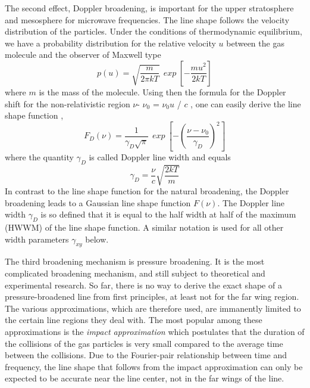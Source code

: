 The second effect, Doppler broadening, is important for the upper
stratosphere and mesosphere for microwave frequencies. The line shape
follows the velocity distribution of the particles. Under the conditions
of thermodynamic equilibrium, we have  a probability distribution for
the relative velocity $u$ between the gas molecule and the observer 
of Maxwell type 
\begin{equation}\label{eq:abs_theory:maxwell_distribution1}
  p(u)=\sqrt{\frac{m}{2\pi kT}}~~exp~\left[-\frac{mu^2}{2kT}\right]
\end{equation}
where $m$ is the mass of the molecule. Using then the formula for the
Doppler shift for the non-relativistic region    $\nu$- $\nu_0$ =
$\nu_0$$u$ / $c$ , one can easily derive the line shape function \citep{bernath:95}, 
\begin{equation}
 F_D(\nu)=\frac{1}{\gamma_D\sqrt{\pi}}~~exp~\left[-\left(\frac{\nu - \nu_0}{\gamma_D}\right)^2\right]
\end{equation}
where the quantity $\gamma_D$ is called Doppler line width and equals
\begin{equation}
 \gamma_D=\frac{\nu}{c}\sqrt{\frac{2kT}{m}}
\end{equation}
In contrast to the line shape function for the natural
broadening, the Doppler broadening leads to a Gaussian
line shape function $F(\nu)$. The Doppler line width $\gamma_D$ is so
defined that it is equal to the half width at half of the maximum
(HWWM) of the line shape function. A similar notation is used
for all other width parameters $\gamma_{xy}$ below.

The third broadening mechanism is pressure broadening.  It is the most
complicated broadening mechanism, and still subject to theoretical and
experimental research. So far, there is no way to derive the exact
shape of a pressure-broadened line from first principles, at least not
for the far wing region. The various approximations, which are
therefore used, are immanently limited to the certain line regions
they deal with.  The most popular among these approximations is the
{\it{impact approximation}} which postulates that the duration of the
collisions of the gas particles is very small compared to the average
time between the collisions.  Due to the Fourier-pair relationship
between time and frequency, the line shape that follows from the
impact approximation can only be expected to be accurate near the line
center, not in the far wings of the line.


